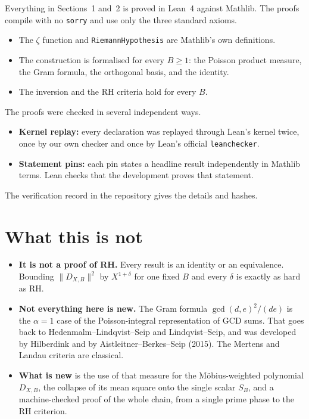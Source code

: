 \documentclass[11pt]{article}
\begin{document}
Everything in Sections~1 and~2 is proved in Lean~4 against Mathlib. The proofs compile with no \texttt{sorry} and use only the three standard axioms.
\begin{itemize}
  \item The $\zeta$ function and \texttt{RiemannHypothesis} are Mathlib's own definitions.
  \item The construction is formalised for every $B \ge 1$: the Poisson product measure, the Gram formula, the orthogonal basis, and the identity.
  \item The inversion and the RH criteria hold for every $B$.
\end{itemize}
The proofs were checked in several independent ways.
\begin{itemize}
  \item \textbf{Kernel replay:} every declaration was replayed through Lean's kernel twice, once by our own checker and once by Lean's official \texttt{leanchecker}.
  \item \textbf{Statement pins:} each pin states a headline result independently in Mathlib terms. Lean checks that the development proves that statement.
\end{itemize}
The verification record in the repository gives the details and hashes.

\section{What this is not}

\begin{itemize}
  \item \textbf{It is not a proof of RH.} Every result is an identity or an equivalence. Bounding $\|D_{X,B}\|^2$ by $X^{1+\delta}$ for one fixed $B$ and every $\delta$ is exactly as hard as RH.
  \item \textbf{Not everything here is new.} The Gram formula $\gcd(d,e)^2/(de)$ is the $\alpha=1$ case of the Poisson-integral representation of GCD sums. That goes back to Hedenmalm--Lindqvist--Seip and Lindqvist--Seip, and was developed by Hilberdink and by Aistleitner--Berkes--Seip (2015). The Mertens and Landau criteria are classical.
  \item \textbf{What is new} is the use of that measure for the M\"obius-weighted polynomial $D_{X,B}$, the collapse of its mean square onto the single scalar $S_B$, and a machine-checked proof of the whole chain, from a single prime phase to the RH criterion.
\end{itemize}
\end{document}
